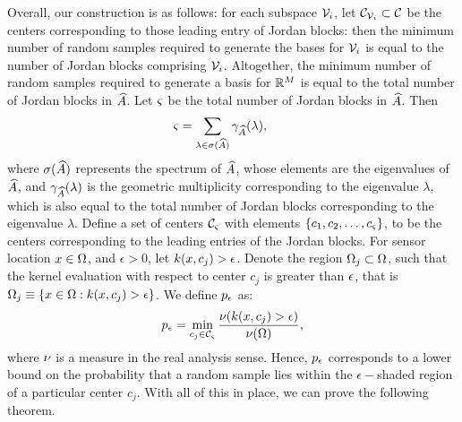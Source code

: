 Overall, our construction is as follows: for each subspace $ \mathcal{V}_i $, let $ \mathcal{C}_{\mathcal{V}_i} \subset \mathcal{C} $ be the centers corresponding to those leading entry of Jordan blocks: then the minimum number of random samples required to generate the bases for $ \mathcal{V}_i $ is equal to the number of Jordan blocks comprising $ \mathcal{V}_i $. Altogether, the minimum number of random samples required to generate a basis for $ \mathbb{R}^M $ is equal to the total number of Jordan blocks in $ \widehat{A} $. Let $ \varsigma $ be the total number of Jordan blocks in $\widehat{A}$. Then
\begin{equation}\label{rands}
\rands = \sum_{\lambda \in \sigma(\dualopApprox)} \gamma_{\dualopApprox}(\lambda), \qquad %
\end{equation}
where $\sigma(\widehat{A}) $ represents the spectrum of $ \widehat{A} $, whose elements are the eigenvalues of $ \widehat{A} $, and $ \gamma_{\widehat{A}}(\lambda) $ is the geometric multiplicity corresponding to the eigenvalue $ \lambda $, which is also equal to the total number of Jordan blocks corresponding to the eigenvalue $ \lambda $. Define a set of centers $ \mathcal{C}_\varsigma $ with elements $ \{c_1, c_2,\dots, c_\varsigma\} $, to be the centers corresponding to the leading entries of  the Jordan blocks.
For sensor location $x\in\Omega$, and $ \epsilon > 0 $, let $k(x, c_j) > \epsilon$. Denote the region $\Omega_j\subset\Omega$, such that the kernel evaluation with respect to center $c_j$ is greater than $\epsilon$, that is $ \Omega_j \equiv \{x\in \Omega:k(x, c_j) > \epsilon\} $. We define
$ p_{\epsilon} $ as:
\begin{equation}\label{ppp}
p_{\epsilon} = \min_{c_j \in \mathcal{C}_\varsigma} \frac{\nu(k(x, c_j) > \epsilon)}{\nu(\Omega)},
\end{equation}
where $\nu$ is a measure in the real analysis sense. Hence, $p_{\epsilon}$ corresponds to a lower bound on the probability that a random sample lies within the $ \epsilon-$shaded region of a particular center $ c_j$. With all of this in place, we can prove the following theorem.

